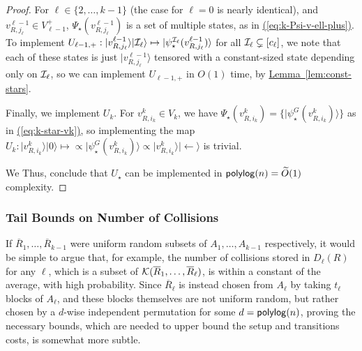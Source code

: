 \documentclass{theoretics}
\newcommand{\eq}[1]{\hyperref[eq:#1]{(\ref*{eq:#1})}}
\newcommand{\lem}[1]{\hyperref[lem:#1]{Lemma~\ref*{lem:#1}}}
\def\ket#1{{\lvert}#1\rangle}
\renewcommand{\>}{\rangle}
\newcommand{\<}{\langle}
\renewcommand{\(}{\left(}
\renewcommand{\)}{\right)}
\begin{document}
\begin{proof}
For $\ell\in\{2,\dots,k-1\}$ (the case for $\ell=0$ is nearly identical), and $v^{\ell-1}_{R,j_{\ell}}\in V_{\ell-1}^+$, $\Psi_\star(v^{\ell-1}_{R,j_{\ell}})$ is a set of multiple states, as in \eq{k-Psi-v-ell-plus}. To implement $U_{\ell-1,+}:\ket{v^{\ell-1}_{R,j_{\ell}}}\ket{{\cal I}_{\ell}}\mapsto \ket{\psi_\star^{{\cal I}_{\ell}}(v^{\ell-1}_{R,j_{\ell}})}$ for all ${\cal I}_{\ell}\subsetneq [c_{\ell}]$, we note that each of these states is just $\ket{v^{\ell-1}_{R,j_{\ell}}}$ tensored with a constant-sized state depending only on ${\cal I}_{\ell}$, so we can implement $U_{\ell-1,+}$ in $O(1)$ time, by \lem{const-stars}.
	
	Finally, we implement $U_k$. For $v^{k}_{R,i_k} \in V_{k}$, we have $\Psi_\star(v^{k}_{R,i_k})=\{\ket{\psi_\star^G(v^{k}_{R,i_k})}\}$ as in \eq{k-star-vk}, so implementing the map $U_k:\ket{v^{k}_{R,i_k}}\ket{0}\mapsto\propto \ket{\psi_\star^G(v^{k}_{R,i_k})}\propto \ket{v^{k}_{R,i_k}}\ket{\leftarrow}$ is trivial.
	
	\noindent We Thus, conclude that $U_\star$ can be implemented in ${\sf polylog}(n)=\widetilde{O}(1)$ complexity.
\end{proof}

\subsubsection{Tail Bounds on Number of Collisions}\label{sec:k-dist-tail}

If $\overline{R}_1,\dots,\overline{R}_{k-1}$ were uniform random subsets of $A_1,\dots,A_{k-1}$ respectively, it would be simple to argue that, for example, the number of collisions stored in $D_{\ell}(R)$ for any $\ell$, which is a subset of ${\cal K}(\overline{R}_1,\dots,\overline{R}_{\ell})$, is within a constant of the average, with high probability. Since $\overline{R}_{\ell}$ is instead chosen from $A_{\ell}$ by taking $t_{\ell}$ blocks of $A_{\ell}$, and these blocks themselves are not uniform random, but rather chosen by a $d$-wise independent permutation for some $d={\sf polylog}(n)$, proving the necessary bounds, which are needed to upper bound the setup and transitions costs, is somewhat more subtle. 
\end{document}
